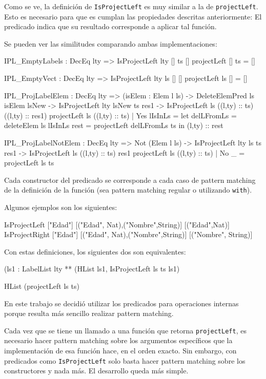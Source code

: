 Como se ve, la definición de \texttt{IsProjectLeft} es muy similar a la de \texttt{projectLeft}. Esto es necesario para que es cumplan las propiedades descritas anteriormente: El predicado indica que su resultado corresponde a aplicar tal función.

Se pueden ver las similitudes comparando ambas implementaciones:

\begin{code}
IPL_EmptyLabels : DecEq lty => IsProjectLeft {lty} [] ts []
projectLeft [] ts = []

IPL_EmptyVect : DecEq lty => IsProjectLeft {lty} ls [] []
projectLeft ls [] = []

IPL_ProjLabelElem : DecEq lty => (isElem : Elem l ls) -> 
    DeleteElemPred ls isElem lsNew ->
    IsProjectLeft {lty} lsNew ts res1 -> 
    IsProjectLeft ls ((l,ty) :: ts) ((l,ty) :: res1)   
projectLeft ls ((l,ty) :: ts) | Yes lIsInLs = 
    let delLFromLs = deleteElem ls lIsInLs
        rest = projectLeft delLFromLs ts
    in (l,ty) :: rest

IPL_ProjLabelNotElem : DecEq lty => Not (Elem l ls) -> 
    IsProjectLeft {lty} ls ts res1 -> 
    IsProjectLeft ls ((l,ty) :: ts) res1
projectLeft ls ((l,ty) :: ts) | No _ = projectLeft ls ts
\end{code}

Cada constructor del predicado se corresponde a cada caso de pattern matching de la definición de la función (sea pattern matching regular o utilizando \texttt{with}).

Algunos ejemplos son los siguientes:

\begin{code}
IsProjectLeft ["Edad"] [("Edad", Nat),("Nombre",String)] 
  [("Edad",Nat)]
IsProjectRight ["Edad"] [("Edad", Nat),("Nombre",String)]
  [("Nombre", String)] 
\end{code}

Con estas definiciones, los siguientes dos son equivalentes:

\begin{code}
(ls1 : LabelList lty ** (HList ls1, IsProjectLeft ls ts ls1)

HList (projectLeft ls ts)
\end{code}

En este trabajo se decidió utilizar los predicados para operaciones internas porque resulta más sencillo realizar pattern matching. 

Cada vez que se tiene un llamado a una función que retorna \texttt{projectLeft}, es necesario hacer pattern matching sobre los argumentos específicos que la implementación de esa función hace, en el orden exacto. Sin embargo, con predicados como \texttt{IsProjectLeft} solo basta hacer pattern matching sobre los constructores y nada más. El desarrollo queda más simple.

